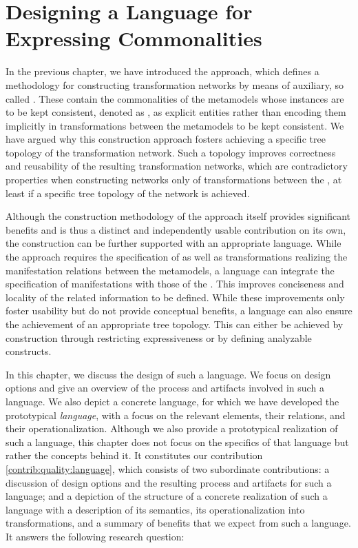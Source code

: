 \chapter{Designing a Language for Expressing Commonalities 
}
\label{chap:language}

In the previous chapter, we have introduced the \commonalities approach, which defines a methodology for constructing transformation networks by means of auxiliary, so called \conceptmetamodels.
These \conceptmetamodels contain the commonalities of the metamodels whose instances are to be kept consistent, denoted as \concretemetamodels, as explicit entities rather than encoding them implicitly in transformations between the metamodels to be kept consistent.
We have argued why this construction approach fosters achieving a specific tree topology of the transformation network.
Such a topology improves correctness and reusability of the resulting transformation networks, which are contradictory properties when constructing networks only of transformations between the \concretemetamodels, at least if a specific tree topology of the network is achieved.

Although the construction methodology of the \commonalities approach itself provides significant benefits and is thus a distinct and independently usable contribution on its own, the construction can be further supported with an appropriate language.
While the approach requires the specification of \conceptmetamodels as well as transformations realizing the manifestation relations between the metamodels, a language can integrate the specification of manifestations with those of the \commonalities.
This improves conciseness and locality of the related information to be defined.
While these improvements only foster usability but do not provide conceptual benefits, a language can also ensure the achievement of an appropriate tree topology.
This can either be achieved by construction through restricting expressiveness or by defining analyzable constructs.

In this chapter, we discuss the design of such a language.
We focus on design options and give an overview of the process and artifacts involved in such a language.
We also depict a concrete language, for which we have developed the prototypical \emph{\commonalities language}, with a focus on the relevant elements, their relations, and their operationalization.
Although we also provide a prototypical realization of such a language, this chapter does not focus on the specifics of that language but rather the concepts behind it.
It constitutes our contribution \autoref{contrib:quality:language}, which consists of two subordinate contributions: a discussion of design options and the resulting process and artifacts for such a language; and a depiction of the structure of a concrete realization of such a language with a description of its semantics, its operationalization into transformations, and a summary of benefits that we expect from such a language.
It answers the following research question:

